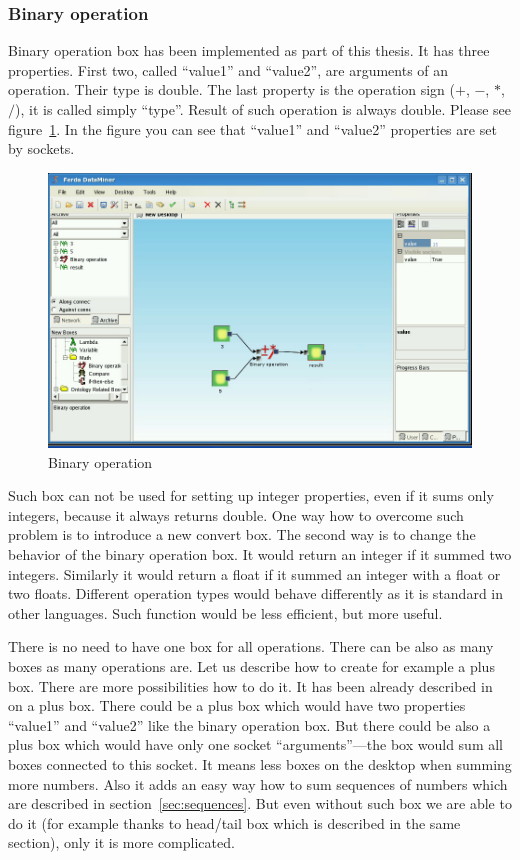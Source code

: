 \documentclass[a4paper,12pt]{book}
\begin{document}
\subsubsection{Binary operation}
Binary operation box has been implemented as part of this thesis. It has three properties. First two, called ``value1'' and ``value2'', are arguments of an operation. Their type is double. The last property is the operation sign ($+$, $-$, $*$, $/$), it is called simply ``type''. Result of such operation is always double. Please see figure~\ref{fig:boxBinaryOperation}. In the figure you can see that ``value1'' and ``value2'' properties are set by sockets.
\begin{figure}
	\includegraphics[width=1\textwidth]{binaryOperation2.png}
	\caption{Binary operation}
	\label{fig:boxBinaryOperation}
\end{figure}

Such box can not be used for setting up integer properties, even if it sums only integers, because it always returns double. One way how to overcome such problem is to introduce a new convert box. The second way is to change the behavior of the binary operation box. It would return an integer if it summed two integers. Similarly it would return a float if it summed an integer with a float or two floats. Different operation types would behave differently as it is standard in other languages. Such function would be less efficient, but more useful.  

There is no need to have one box for all operations. There can be also as many boxes as many operations are. Let us describe how to create for example a plus box. There are more possibilities how to do it. It has been already described in~\cite{znalosti2006} on a plus box. There could be a plus box which would have two properties ``value1'' and ``value2'' like the binary operation box. But there could be also a plus box which would have only one socket ``arguments''---the box would sum all boxes connected to this socket. It means less boxes on the desktop when summing more numbers. Also it adds an easy way how to sum sequences of numbers which are described in section~\ref{sec:sequences}. But even without such box we are able to do it (for example thanks to head/tail box which is described in the same section), only it is more complicated.    
\end{document}
